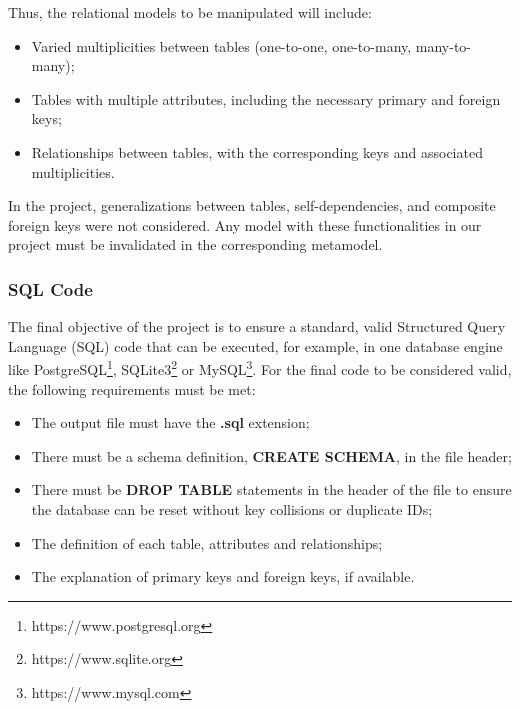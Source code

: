\documentclass[10pt]{article}
\begin{document}
Thus, the relational models to be manipulated will include:

\begin{itemize}

    \item Varied multiplicities between tables (one-to-one, one-to-many, many-to-many);
    
    \item Tables with multiple attributes, including the necessary primary and foreign keys;
    
    \item Relationships between tables, with the corresponding keys and associated multiplicities.
    
\end{itemize}

In the project, generalizations between tables, self-dependencies, and composite foreign keys were not considered. Any model with these functionalities in our project must be invalidated in the corresponding metamodel.

\subsubsection{SQL Code}

The final objective of the project is to ensure a standard, valid Structured Query Language (SQL) code that can be executed, for example, in one database engine like PostgreSQL\footnote{https://www.postgresql.org}, SQLite3\footnote{https://www.sqlite.org} or MySQL\footnote{https://www.mysql.com}. For the final code to be considered valid, the following requirements must be met:

\begin{itemize}

    \item The output file must have the \textbf{.sql} extension;
    
    \item There must be a schema definition, \textbf{CREATE SCHEMA}, in the file header;
    
    \item There must be \textbf{DROP TABLE} statements in the header of the file to ensure the database can be reset without key collisions or duplicate IDs;
    
    \item The definition of each table, attributes and relationships;
    
    \item The explanation of primary keys and foreign keys, if available.
    
\end{itemize}
\end{document}
